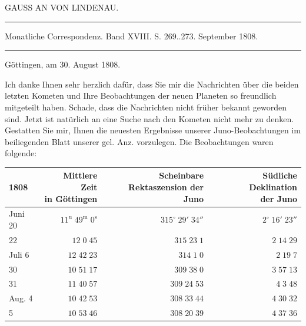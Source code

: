 \begin{center}
GAUSS AN VON LINDENAU.
\end{center}

\hrule
\begin{center}
\fontsize{10}{12}\selectfont Monatliche Correspondenz. Band XVIII. S. 269..273. September 1808.
\end{center}
\hrule

\begin{flushright}
Göttingen, am 30. August 1808.
\end{flushright}

\par\indent Ich danke Ihnen sehr herzlich dafür, dass Sie mir die Nachrichten über die beiden letzten Kometen und Ihre Beobachtungen der neuen Planeten so freundlich mitgeteilt haben. Schade, dass die Nachrichten nicht früher bekannt geworden sind. Jetzt ist natürlich an eine Suche nach den Kometen nicht mehr zu denken. Gestatten Sie mir, Ihnen die neuesten Ergebnisse unserer Juno-Beobachtungen im beiliegenden Blatt unserer gel. Anz. vorzulegen. Die Beobachtungen waren folgende:


\begin{center}\fontsize{10}{12}\selectfont\setlength{\tabcolsep}{3pt}\renewcommand{\arraystretch}{1.15}\begin{tabular}{lrrr}
1808 & \shortstack{Mittlere Zeit\\in Göttingen} & \shortstack{Scheinbare\\Rektaszension der Juno} & \shortstack{Südliche Deklination\\der Juno}\\\hline
Juni 20 & $11^{\text{u}}\;49^{\text{m}}\;0^{\text{s}}$ & $315^\circ\;29'\;34''$ & $2^\circ\;16'\;23''$\\
22 & $12\;0\;45$ & $315\;23\;1$ & $2\;14\;29$\\
Juli 6 & $12\;42\;23$ & $314\;1\;0$ & $2\;19\;7$\\
30 & $10\;51\;17$ & $309\;38\;0$ & $3\;57\;13$\\
31 & $11\;40\;57$ & $309\;24\;53$ & $4\;3\;48$\\
Aug. 4 & $10\;42\;53$ & $308\;33\;44$ & $4\;30\;32$\\
5 & $10\;53\;46$ & $308\;20\;39$ & $4\;37\;36$\\
\end{tabular}\end{center}


